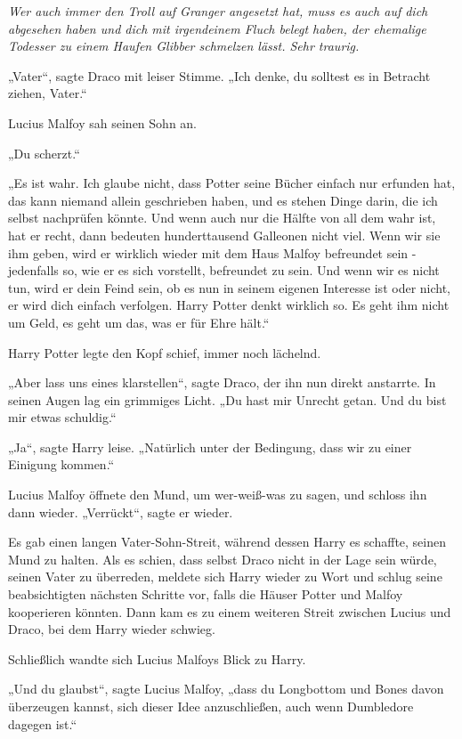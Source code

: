 {\emph{Wer auch immer den Troll auf Granger angesetzt hat, muss es auch auf dich abgesehen haben und dich mit irgendeinem Fluch belegt haben, der ehemalige Todesser zu einem Haufen Glibber schmelzen lässt. Sehr traurig.}

„Vater“, sagte Draco mit leiser Stimme. „Ich denke, du solltest es in Betracht ziehen, Vater.“

Lucius Malfoy sah seinen Sohn an.

„Du scherzt.“

„Es ist wahr. Ich glaube nicht, dass Potter seine Bücher einfach nur erfunden hat, das kann niemand allein geschrieben haben, und es stehen Dinge darin, die ich selbst nachprüfen könnte. Und wenn auch nur die Hälfte von all dem wahr ist, hat er recht, dann bedeuten hunderttausend Galleonen nicht viel. Wenn wir sie ihm geben, wird er wirklich wieder mit dem Haus Malfoy befreundet sein - jedenfalls so, wie er es sich vorstellt, befreundet zu sein. Und wenn wir es nicht tun, wird er dein Feind sein, ob es nun in seinem eigenen Interesse ist oder nicht, er wird dich einfach verfolgen. Harry Potter denkt wirklich so. Es geht ihm nicht um Geld, es geht um das, was er für Ehre hält.“

Harry Potter legte den Kopf schief, immer noch lächelnd.

„Aber lass uns eines klarstellen“, sagte Draco, der ihn nun direkt anstarrte. In seinen Augen lag ein grimmiges Licht. „Du hast mir Unrecht getan. Und du bist mir etwas schuldig.“

„Ja“, sagte Harry leise. „Natürlich unter der Bedingung, dass wir zu einer Einigung kommen.“

Lucius Malfoy öffnete den Mund, um wer-weiß-was zu sagen, und schloss ihn dann wieder. „Verrückt“, sagte er wieder.

Es gab einen langen Vater-Sohn-Streit, während dessen Harry es schaffte, seinen Mund zu halten. Als es schien, dass selbst Draco nicht in der Lage sein würde, seinen Vater zu überreden, meldete sich Harry wieder zu Wort und schlug seine beabsichtigten nächsten Schritte vor, falls die Häuser Potter und Malfoy kooperieren könnten. Dann kam es zu einem weiteren Streit zwischen Lucius und Draco, bei dem Harry wieder schwieg.

Schließlich wandte sich Lucius Malfoys Blick zu Harry.

„Und du glaubst“, sagte Lucius Malfoy, „dass du Longbottom und Bones davon überzeugen kannst, sich dieser Idee anzuschließen, auch wenn Dumbledore dagegen ist.“

}
